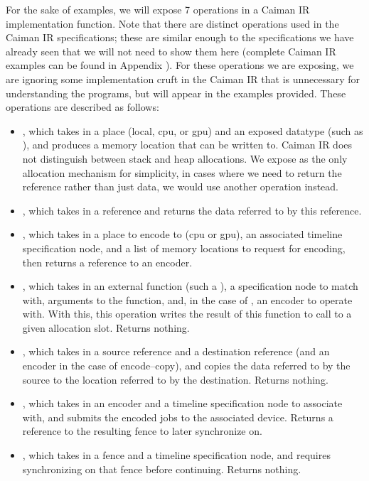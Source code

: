 For the sake of examples, we will expose 7 operations in a Caiman IR implementation function.  Note that there are distinct operations used in the Caiman IR specifications; these are similar enough to the specifications we have already seen that we will not need to show them here (complete Caiman IR examples can be found in Appendix ).  For these operations we are exposing, we are ignoring some implementation cruft in the Caiman IR that is unnecessary for understanding the programs, but will appear in the examples provided.  These operations are described as follows:
%
\begin{itemize}
\item {}, which takes in a place (local, cpu, or gpu) and an exposed datatype (such as ), and produces a memory location that can be written to.  Caiman IR does not distinguish between stack and heap allocations.  We expose  as the only allocation mechanism for simplicity, in cases where we need to return the reference rather than just data, we would use another operation instead.
\item {}, which takes in a reference and returns the data referred to by this reference.
\item {}, which takes in a place to encode to (cpu or gpu), an associated timeline specification node, and a list of memory locations to request for encoding, then returns a reference to an encoder.
\item {}, which takes in an external function (such a ), a specification node to match with, arguments to the function, and, in the case of , an encoder to operate with.  With this, this operation writes the result of this function to call to a given allocation slot.  Returns nothing.
\item {}, which takes in a source reference and a destination reference (and an encoder in the case of encode--copy), and copies the data referred to by the source to the location referred to by the destination.  Returns nothing.
\item {}, which takes in an encoder and a timeline specification node to associate with, and submits the encoded jobs to the associated device.  Returns a reference to the resulting fence to later synchronize on.
\item {}, which takes in a fence and a timeline specification node, and requires synchronizing on that fence before continuing.  Returns nothing.
\end{itemize}
